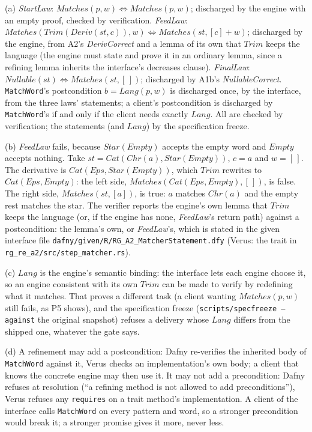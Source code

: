 \documentclass[11pt]{article}
\begin{document}
\begin{answer}
(a) \emph{StartLaw}: $\mathit{Matches}(p, w) \iff \mathit{Matches}(p, w)$;
discharged by the engine with an empty proof, checked by verification.
\emph{FeedLaw}: $\mathit{Matches}(\mathit{Trim}(\mathit{Deriv}(st, c)), w)
\iff \mathit{Matches}(st, [c] + w)$; discharged by the engine, from A2's
\emph{DerivCorrect} and a lemma of its own that $\mathit{Trim}$ keeps the
language (the engine must state and prove it in an ordinary lemma, since a
refining lemma inherits the interface's decreases clause). \emph{FinalLaw}:
$\mathit{Nullable}(st) \iff \mathit{Matches}(st, [\,])$; discharged by A1b's
\emph{NullableCorrect}. \texttt{MatchWord}'s postcondition
$b = \mathit{Lang}(p, w)$ is discharged once, by the interface, from the three
laws' statements; a client's postcondition is discharged by
\texttt{MatchWord}'s if and only if the client needs exactly $\mathit{Lang}$.
All are checked by verification; the statements (and $\mathit{Lang}$) by the
specification freeze.

(b) \emph{FeedLaw} fails, because $\mathit{Star}(\mathit{Empty})$ accepts the
empty word and $\mathit{Empty}$ accepts nothing. Take
$st = \mathit{Cat}(\mathit{Chr}(a), \mathit{Star}(\mathit{Empty}))$, $c = a$
and $w = [\,]$. The derivative is
$\mathit{Cat}(\mathit{Eps}, \mathit{Star}(\mathit{Empty}))$, which
$\mathit{Trim}$ rewrites to $\mathit{Cat}(\mathit{Eps}, \mathit{Empty})$: the
left side, $\mathit{Matches}(\mathit{Cat}(\mathit{Eps}, \mathit{Empty}), [\,])$,
is false. The right side, $\mathit{Matches}(st, [a])$, is true: $a$ matches
$\mathit{Chr}(a)$ and the empty rest matches the star. The verifier reports
the engine's own lemma that $\mathit{Trim}$ keeps the language (or, if the
engine has none, \emph{FeedLaw}'s return path) against a postcondition: the
lemma's own, or \emph{FeedLaw}'s, which is stated in the given interface file
\texttt{dafny/given/R/RG\_A2\_MatcherStatement.dfy} (Verus: the trait in
\texttt{rg\_re\_a2/src/step\_matcher.rs}).

(c) $\mathit{Lang}$ is the engine's semantic binding: the interface lets each
engine choose it, so an engine consistent with its own $\mathit{Trim}$ can be
made to verify by redefining what it matches. That proves a different task
(a client wanting $\mathit{Matches}(p, w)$ still fails, as P5 shows), and the
specification freeze (\texttt{scripts/specfreeze --against} the original
snapshot) refuses a delivery whose $\mathit{Lang}$ differs from the shipped
one, whatever the gate says.

(d) A refinement may add a postcondition: Dafny re-verifies the inherited
body of \texttt{MatchWord} against it, Verus checks an implementation's own
body; a client that knows the concrete engine may then use it. It may not add
a precondition: Dafny refuses at resolution (``a refining method is not
allowed to add preconditions''), Verus refuses any \texttt{requires} on a
trait method's implementation. A client of the interface calls
\texttt{MatchWord} on every pattern and word, so a stronger precondition
would break it; a stronger promise gives it more, never less.
\end{answer}
\end{document}
